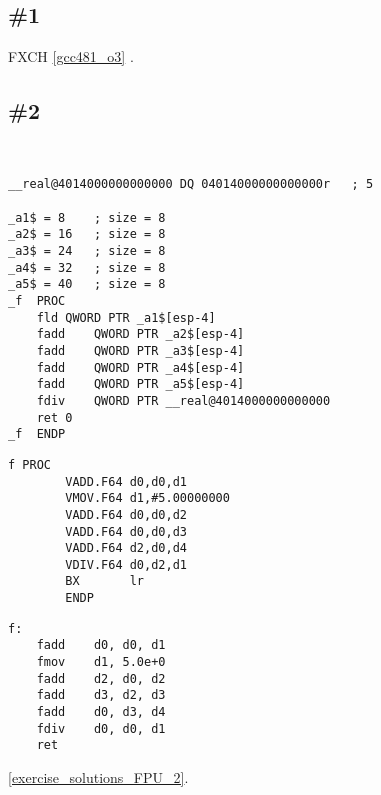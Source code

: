 \section{\Exercises}

\subsection{\Exercise \#1}

 FXCH  
\ref{gcc481_o3} .

\subsection{\Exercise \#2}
\label{exercise_FPU_2}

\WhatThisCodeDoes\

\begin{lstlisting}[caption=\Optimizing MSVC 2010]
__real@4014000000000000 DQ 04014000000000000r	; 5

_a1$ = 8	; size = 8
_a2$ = 16	; size = 8
_a3$ = 24	; size = 8
_a4$ = 32	; size = 8
_a5$ = 40	; size = 8
_f	PROC
	fld	QWORD PTR _a1$[esp-4]
	fadd	QWORD PTR _a2$[esp-4]
	fadd	QWORD PTR _a3$[esp-4]
	fadd	QWORD PTR _a4$[esp-4]
	fadd	QWORD PTR _a5$[esp-4]
	fdiv	QWORD PTR __real@4014000000000000
	ret	0
_f	ENDP
\end{lstlisting}

\begin{lstlisting}[caption=\NonOptimizingKeilVI (\ThumbMode{} / \RU{скомпилировано для}\EN{compiled for} Cortex-R4F CPU)]
f PROC
        VADD.F64 d0,d0,d1
        VMOV.F64 d1,#5.00000000
        VADD.F64 d0,d0,d2
        VADD.F64 d0,d0,d3
        VADD.F64 d2,d0,d4
        VDIV.F64 d0,d2,d1
        BX       lr
        ENDP
\end{lstlisting}

\begin{lstlisting}[caption=\Optimizing GCC 4.9 (ARM64)]
f:
	fadd	d0, d0, d1
	fmov	d1, 5.0e+0
	fadd	d2, d0, d2
	fadd	d3, d2, d3
	fadd	d0, d3, d4
	fdiv	d0, d0, d1
	ret
\end{lstlisting}



\Answer\: \ref{exercise_solutions_FPU_2}.
